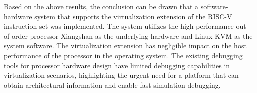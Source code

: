 \begin{eabstract}
Based on the above results,
the conclusion can be drawn that a software-hardware system that supports the virtualization extension of the RISC-V instruction set was implemented.
The system utilizes the high-performance out-of-order processor Xiangshan as the underlying hardware and Linux-KVM as the system software.
The virtualization extension has negligible impact on the host performance of the processor in the operating system.
The existing debugging tools for processor hardware design have limited debugging capabilities in virtualization scenarios,
highlighting the urgent need for a platform that can obtain architectural information and enable fast simulation debugging.
\end{eabstract}
